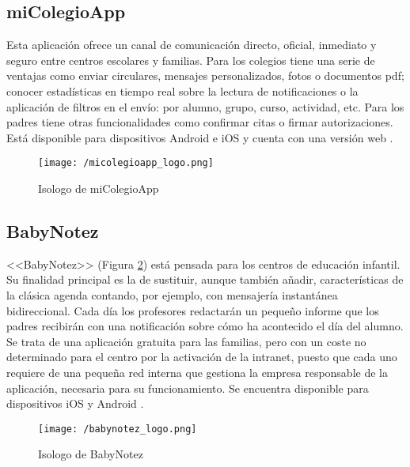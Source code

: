 \subsection{miColegioApp}
Esta aplicación ofrece un canal de comunicación directo, oficial, inmediato y seguro entre centros escolares y familias. Para los colegios tiene una serie de ventajas como enviar circulares, mensajes personalizados, fotos o documentos pdf; conocer estadísticas en tiempo real sobre la lectura de notificaciones o la aplicación de filtros en el envío: por alumno, grupo, curso, actividad, etc. Para los padres tiene otras funcionalidades como confirmar citas o firmar autorizaciones. Está disponible para dispositivos Android e iOS y cuenta con una versión web \cite{creaTactil}.

\begin{figure}[!h]
	\begin{center}
		\texttt{[image: /micolegioapp\_logo.png]}
		\caption{Isologo de miColegioApp}
		\label{fig:micolegioapp}
	\end{center}
\end{figure}

\subsection{BabyNotez}
<<BabyNotez>> (Figura \ref{fig:babynotez}) está pensada para los centros de educación infantil. Su finalidad principal es la de sustituir, aunque también añadir, características de la clásica agenda contando, por ejemplo, con mensajería instantánea bidireccional. Cada día los profesores redactarán un pequeño informe que los padres recibirán con una notificación sobre cómo ha acontecido el día del alumno. Se trata de una aplicación gratuita para las familias, pero con un coste no determinado para el centro por la activación de la intranet, puesto que cada uno requiere de una pequeña red interna que gestiona la empresa responsable de la aplicación, necesaria para su funcionamiento. Se encuentra disponible para dispositivos iOS y Android \cite{Educo2016}.

\begin{figure}[!h]
	\begin{center}
		\texttt{[image: /babynotez\_logo.png]}
		\caption{Isologo de BabyNotez}
		\label{fig:babynotez}
	\end{center}
\end{figure}

\newpage


